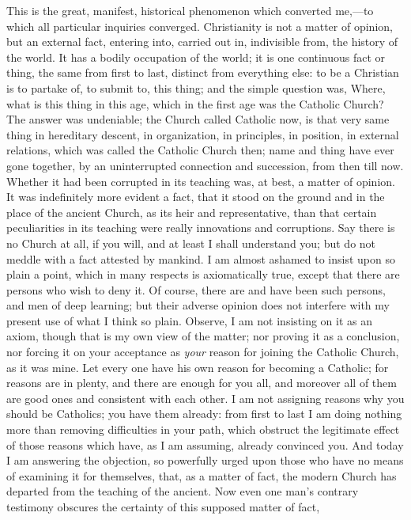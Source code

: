 This is the great, manifest, historical phenomenon which converted
me,—to which all particular inquiries converged. Christianity is not
a matter of opinion, but an external fact, entering into, carried out
in, indivisible from, the history of the world. It has a bodily
occupation of the world; it is one continuous fact or thing, the same
from first to last, distinct from everything else: to be a Christian
is to partake of, to submit to, this thing; and the simple question
was, Where, what is this thing in this age, which in the first age was
the Catholic Church? The answer was undeniable; the Church called
Catholic now, is that very same thing in hereditary descent, in
organization, in principles, in position, in external relations, which
was called the Catholic Church then; name and thing have ever gone
together, by an uninterrupted connection and succession, from then
till now. Whether it had been corrupted in its teaching was, at best,
a matter of opinion. It was indefinitely more evident a fact, that it
stood on the ground and in the place of the ancient Church, as its
heir and representative, than that certain peculiarities in its
teaching were really innovations and corruptions. Say there is no
Church at all, if you will, and at least I shall understand you; but
do not meddle with a fact attested by mankind. I am almost ashamed to
insist upon so plain a point, which in many respects is axiomatically
true, except that there are persons who wish to deny it. Of course,
there are and have been such persons, and men of deep learning; but
their adverse opinion does not interfere with my present use of what I
think so plain. Observe, I am not insisting on it as an axiom, though
that is my own view of the matter; nor proving it as a conclusion, nor
forcing it on your acceptance as \emph{your} reason for joining the
Catholic Church, as it was mine. Let every one have his own reason for
becoming a Catholic; for reasons are in plenty, and there are enough
for you all, and moreover all of them are good ones and consistent
with each other. I am not assigning reasons why you should be
Catholics; you have them already: from first to last I am doing
nothing more than removing difficulties in your path, which obstruct
the legitimate effect of those reasons which have, as I am assuming,
already convinced you. And today I am answering the objection, so
powerfully urged upon those who have no means of examining it for
themselves, that, as a matter of fact, the modern Church has departed
from the teaching of the ancient. Now even one man's contrary
testimony obscures the certainty of this supposed matter of fact,
